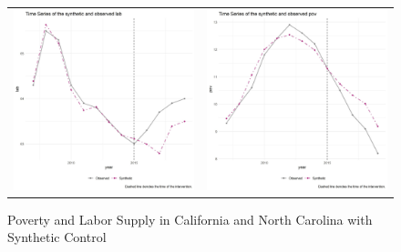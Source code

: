\documentclass{article}
\begin{document}
\begin{figure}
\begin{center}
\caption{Poverty and Labor Supply in California and North Carolina with Synthetic Control}
\begin{tabular}{cc}
 \includegraphics[width=80mm]{ca_lab_trend} &   \includegraphics[width=80mm]{ca_pov_trend} \\

\end{tabular}
\end{center}
\end{figure}
\end{document}

